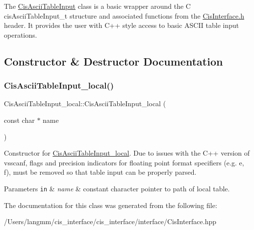 The \mbox{\hyperlink{classCisAsciiTableInput}{Cis\+Ascii\+Table\+Input}} class is a basic wrapper around the C cis\+Ascii\+Table\+Input\+\_\+t structure and associated functions from the \mbox{\hyperlink{CisInterface_8h_source}{Cis\+Interface.\+h}} header. It provides the user with C++ style access to basic A\+S\+C\+II table input operations. 

\subsection{Constructor \& Destructor Documentation}
\mbox{\label{classCisAsciiTableInput__local_a1f7f46702f688c571b4c86617ef5035d}} 
\subsubsection{\texorpdfstring{Cis\+Ascii\+Table\+Input\+\_\+local()}{CisAsciiTableInput\_local()}}
{\footnotesize\ttfamily Cis\+Ascii\+Table\+Input\+\_\+local\+::\+Cis\+Ascii\+Table\+Input\+\_\+local (\begin{DoxyParamCaption}\item[{const char $\ast$}]{name }\end{DoxyParamCaption})\hspace{0.3cm}{\ttfamily [inline]}}



Constructor for \mbox{\hyperlink{classCisAsciiTableInput__local}{Cis\+Ascii\+Table\+Input\+\_\+local}}. Due to issues with the C++ version of vsscanf, flags and precision indicators for floating point format specifiers (e.\+g. e, f), must be removed so that table input can be properly parsed. 


\begin{DoxyParams}[1]{Parameters}
\mbox{\tt in}  & {\em name} & constant character pointer to path of local table. \\
\hline
\end{DoxyParams}


The documentation for this class was generated from the following file\+:\begin{DoxyCompactItemize}
\item 
/\+Users/langmm/cis\+\_\+interface/cis\+\_\+interface/interface/Cis\+Interface.\+hpp\end{DoxyCompactItemize}
